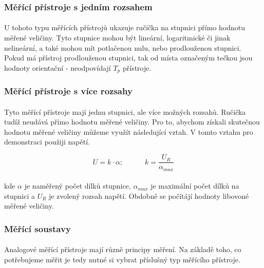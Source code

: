 \documentclass{praktikum}
\begin{document}
\subsubsection{Měřící přístroje s jedním rozsahem}
\paragraph{}
U tohoto typu měřících přístrojů ukazuje ručička na stupnici přímo hodnotu měřené veličiny. Tyto stupnice mohou být lineární, logaritmické či jinak nelineární, a také mohou mít potlačenou nulu, nebo prodlouženou stupnici. Pokud má přístroj prodlouženou stupnici, tak od místa označeným tečkou jsou hodnoty orientační - neodpovídají $T_p$ přístroje.

\subsubsection{Měřící přístroje s více rozsahy}
\paragraph{}
Tyto měřící přístroje mají jednu stupnici, ale více možných rozsahů. Ručička tudíž neudává přímo hodnotu měřené veličiny. Pro to, abychom získali skutečnou hodnotu měřené veličiny můžeme využít následující vztah. V tomto vztahu pro demonstraci použiji napětí.

\begin{equation}
\label{eqn:skutečná_naměřená_hodnota}
U=k\cdot \alpha ; \quad \quad \quad k = \frac{U_R}{\alpha _{max}}
\end{equation}
\paragraph{}
kde $\alpha$ je naměřený počet dílků stupnice, $\alpha _{max}$ je maximální počet dílků na stupnici a $U_R$ je zvolený rozsah napětí. Obdobně se počítájí hodnoty libovoné měřené veličiny.

\subsubsection{Měřící soustavy}
\paragraph{}
Analogové měřící přístroje mají různě principy měření. Na základě toho, co potřebujeme měřit je tedy nutné si vybrat příslušný typ měřícího přístroje.
\end{document}
